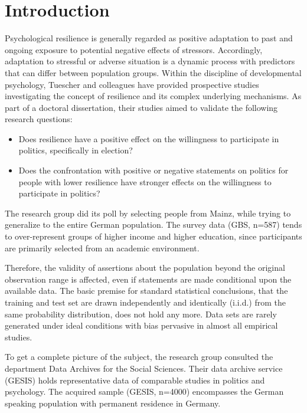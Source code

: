 \chapter{Introduction}

Psychological resilience is generally regarded as positive adaptation to past and ongoing exposure to potential negative effects of stressors. Accordingly, adaptation to stressful or adverse situation is a dynamic process with predictors that can differ between population groups. Within the discipline of developmental psychology, Tuescher and colleagues have provided prospective studies investigating the concept of resilience and its complex underlying mechanisms. As part of a doctoral dissertation, their studies aimed to validate the following research questions:

\begin{itemize}
    \item Does resilience have a positive effect on the willingness to participate in politics, specifically in election?
    \item Does the confrontation with positive or negative statements on politics for people with lower resilience have stronger effects on the willingness to participate in politics?
\end{itemize}

The research group did its poll by selecting people from Mainz, while trying to generalize to the entire German population. The survey data (GBS, n=587) tends to over-represent groups of higher income and higher education, since participants are primarily selected from an academic environment.

Therefore, the validity of assertions about the population beyond the original observation range is affected, even if statements are made conditional upon the available data. The basic premise for standard statistical conclusions, that the training and test set are drawn independently and identically (i.i.d.) from the same probability distribution, does not hold any more. Data sets are rarely generated under ideal conditions with bias pervasive in almost all empirical studies.

To get a complete picture of the subject, the research group consulted the department Data Archives for the Social Sciences. Their data archive service (GESIS) holds representative data of comparable studies in politics and psychology. The acquired sample (GESIS, n=4000) encompasses the German speaking population with permanent residence in Germany. 

